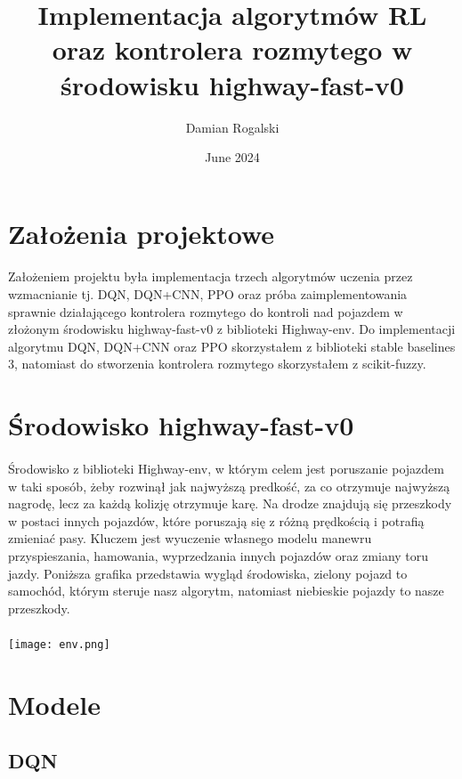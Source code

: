 \documentclass{article}
\title{Implementacja algorytmów RL oraz kontrolera rozmytego w środowisku highway-fast-v0}
\author{Damian Rogalski}
\date{June 2024}
\begin{document}
\maketitle

\section{Założenia projektowe}
\paragraph{}
Założeniem projektu była implementacja trzech algorytmów uczenia przez wzmacnianie tj. DQN, DQN+CNN, PPO oraz próba zaimplementowania sprawnie działającego kontrolera rozmytego do kontroli nad pojazdem w złożonym środowisku highway-fast-v0 z biblioteki Highway-env. Do implementacji algorytmu DQN, DQN+CNN oraz PPO skorzystałem z biblioteki stable baselines 3, natomiast do stworzenia kontrolera rozmytego skorzystałem z scikit-fuzzy.

\section{Środowisko highway-fast-v0}
\paragraph{}
Środowisko z biblioteki Highway-env, w którym celem jest poruszanie pojazdem w taki sposób, żeby rozwinął jak najwyższą predkość, za co otrzymuje najwyższą nagrodę, lecz za każdą kolizję otrzymuje karę. Na drodze znajdują się przeszkody w postaci innych pojazdów, które poruszają się z różną prędkością i potrafią zmieniać pasy. Kluczem jest wyuczenie własnego modelu manewru przyspieszania, hamowania, wyprzedzania innych pojazdów oraz zmiany toru jazdy.
Poniższa grafika przedstawia wygląd środowiska, zielony pojazd to samochód, którym steruje nasz algorytm, natomiast niebieskie pojazdy to nasze przeszkody.

\paragraph{}
\texttt{[image: env.png]}

\newpage


\section{Modele}
\subsection{DQN}
\end{document}

